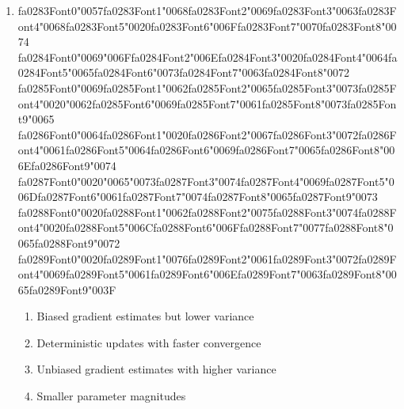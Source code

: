 \documentclass[12pt]{article}
\begin{document}
\begin{enumerate}[label=Q\arabic*.]
 \item {\csname fa0283Font0\endcsname\char"0057}{\csname fa0283Font1\endcsname\char"0068}{\csname fa0283Font2\endcsname\char"0069}{\csname fa0283Font3\endcsname\char"0063}{\csname fa0283Font4\endcsname\char"0068}{\csname fa0283Font5\endcsname\char"0020}{\csname fa0283Font6\endcsname\char"006F}{\csname fa0283Font7\endcsname\char"0070}{\csname fa0283Font8\endcsname\char"0074} {\csname fa0284Font0\endcsname\char"0069}{\char"006F}{\csname fa0284Font2\endcsname\char"006E}{\csname fa0284Font3\endcsname\char"0020}{\csname fa0284Font4\endcsname\char"0064}{\csname fa0284Font5\endcsname\char"0065}{\csname fa0284Font6\endcsname\char"0073}{\csname fa0284Font7\endcsname\char"0063}{\csname fa0284Font8\endcsname\char"0072} {\csname fa0285Font0\endcsname\char"0069}{\csname fa0285Font1\endcsname\char"0062}{\csname fa0285Font2\endcsname\char"0065}{\csname fa0285Font3\endcsname\char"0073}{\csname fa0285Font4\endcsname\char"0020}{\char"0062}{\csname fa0285Font6\endcsname\char"0069}{\csname fa0285Font7\endcsname\char"0061}{\csname fa0285Font8\endcsname\char"0073}{\csname fa0285Font9\endcsname\char"0065} {\csname fa0286Font0\endcsname\char"0064}{\csname fa0286Font1\endcsname\char"0020}{\csname fa0286Font2\endcsname\char"0067}{\csname fa0286Font3\endcsname\char"0072}{\csname fa0286Font4\endcsname\char"0061}{\csname fa0286Font5\endcsname\char"0064}{\csname fa0286Font6\endcsname\char"0069}{\csname fa0286Font7\endcsname\char"0065}{\csname fa0286Font8\endcsname\char"006E}{\csname fa0286Font9\endcsname\char"0074} {\csname fa0287Font0\endcsname\char"0020}{\char"0065}{\char"0073}{\csname fa0287Font3\endcsname\char"0074}{\csname fa0287Font4\endcsname\char"0069}{\csname fa0287Font5\endcsname\char"006D}{\csname fa0287Font6\endcsname\char"0061}{\csname fa0287Font7\endcsname\char"0074}{\csname fa0287Font8\endcsname\char"0065}{\csname fa0287Font9\endcsname\char"0073} {\csname fa0288Font0\endcsname\char"0020}{\csname fa0288Font1\endcsname\char"0062}{\csname fa0288Font2\endcsname\char"0075}{\csname fa0288Font3\endcsname\char"0074}{\csname fa0288Font4\endcsname\char"0020}{\csname fa0288Font5\endcsname\char"006C}{\csname fa0288Font6\endcsname\char"006F}{\csname fa0288Font7\endcsname\char"0077}{\csname fa0288Font8\endcsname\char"0065}{\csname fa0288Font9\endcsname\char"0072} {\csname fa0289Font0\endcsname\char"0020}{\csname fa0289Font1\endcsname\char"0076}{\csname fa0289Font2\endcsname\char"0061}{\csname fa0289Font3\endcsname\char"0072}{\csname fa0289Font4\endcsname\char"0069}{\csname fa0289Font5\endcsname\char"0061}{\csname fa0289Font6\endcsname\char"006E}{\csname fa0289Font7\endcsname\char"0063}{\csname fa0289Font8\endcsname\char"0065}{\csname fa0289Font9\endcsname\char"003F}
 \begin{enumerate}[label=(\Alph*)]
     \item Biased gradient estimates but lower variance
     \item Deterministic updates with faster convergence
     \item Unbiased gradient estimates with higher variance
     \item Smaller parameter magnitudes
 \end{enumerate}
 

\end{enumerate}
\end{document}
